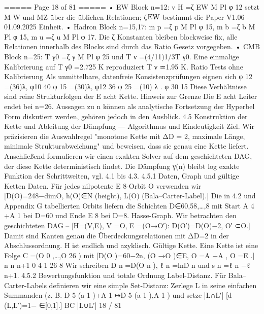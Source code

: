 \begin{MyVerbatim}
===== Page 18 of 81 =====
• EW Block n=12: v H =ζ EW M Pl φ 12 setzt M W und MZ über die üblichen Relationen; $\zeta{\rm EW}$ bestimmt die
Paper V1.06 - 01.09.2025
Einheit.
• Hadron Block n=15,17: m p =ζ p M Pl φ 15, m b =ζ b M Pl φ 15, m u =ζ u M Pl φ 17. Die ζ Konstanten bleiben blockweise fix, alle
Relationen innerhalb des Blocks sind durch das Ratio Gesetz vorgegeben.
• CMB Block n=25: T γ0 =ζ γ M Pl φ 25 und T ν =(4/11)1/3T γ0. Eine einmalige Kalibrierung auf T γ0 =2.725 K reproduziert
T
ν
≃1.95 K.
Ratio Tests ohne Kalibrierung
Als unmittelbare, datenfreie Konsistenzprüfungen eignen sich
φ
12
=(36)λ,
φ10 40
φ
15
=(30)λ,
φ12 36
φ 25 =(10) λ .
φ 30
15
Diese Verhältnisse sind reine Strukturfolgen der E acht Kette.
Hinweis zur Grenze Die E acht Leiter endet bei n=26. Aussagen zu n können als analytische Fortsetzung der
Hyperbel Form diskutiert werden, gehören jedoch in den Ausblick.
4.5 Konstruktion der Kette und Ableitung der Dämpfung — Algorithmus und
Eindeutigkeit
Ziel. Wir präzisieren die Auswahlregel "monotone Kette mit ΔD = 2, maximale Länge, minimale Strukturabweichung" und
beweisen, dass sie genau eine Kette liefert. Anschließend formulieren wir einen exakten Solver auf dem geschichteten
DAG, der diese Kette deterministisch findet. Die Dämpfung γ(n) bleibt log exakte Funktion der Schrittweiten, vgl. 4.1 bis
4.3.
4.5.1 Daten, Graph und gültige Ketten
Daten. Für jedes nilpotente E 8-Orbit O verwenden wir
[D(O)=248−dimO, h(O)∈N (height), L(O) (Bala–Carter-Label).]
Die in 4.2 und Appendix G tabellierten Orbits liefern die Schichten D∈{60,58,…,8} mit Start A 4 +A 1 bei D=60 und
Ende E 8 bei D=8.
Hasse-Graph. Wir betrachten den geschichteten DAG
–
[H=(V,E), V ={O}, E ={(O→O′): D(O′)=D(O)−2, O′ ⊂O}.]
Damit sind Kanten genau die Überdeckungsrelationen mit ΔD=2 in der Abschlussordnung. H ist endlich und azyklisch.
Gültige Kette. Eine Kette ist eine Folge C =(O 0 ,…,O 26 ) mit
[D(O )=60−2n, (O →O )∈E, O =A +A , O =E .]
n n n+1 0 4 1 26 8
Wir schreiben D n =D(O n ), ℓ n =lnD n und s n =ℓ n −ℓ n+1.
4.5.2 Bewertungsfunktion und totale Ordnung
Label-Distanz. Für Bala–Carter-Labels definieren wir eine simple Set-Distanz: Zerlege L in seine einfachen Summanden
(z. B. D 5 (a 1 )+A 1 ↦{D 5 (a 1 ),A 1 }) und setze
|L∩L′|
[d (L,L′)=1− ∈[0,1].]
BC |L∪L′|
18 / 81


\end{MyVerbatim}

